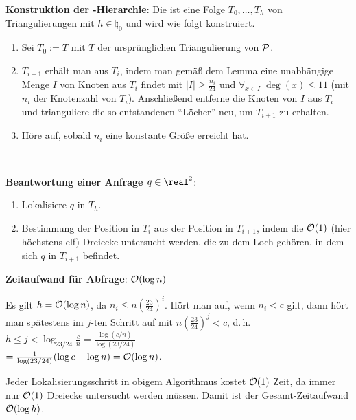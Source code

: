\textbf{Konstruktion der -Hierarchie}:
Die  ist eine Folge $T_0, \dotsc, T_h$
von Triangulierungen mit $h \in \natural_0$ und wird wie folgt konstruiert.
\begin{enumerate}
    \item
    Sei $T_0 := T$ mit $T$ der ursprünglichen Triangulierung von $\P$.
    
    \item
    $T_{i+1}$ erhält man aus $T_i$, indem man gemäß dem Lemma eine unabhängige Menge
    $I$ von Knoten aus $T_i$ findet mit
    $|I| \ge \frac{n_i}{24}$ und $\forall_{x \in I}\; \deg(x) \le 11$
    (mit $n_i$ der Knotenzahl von $T_i$).
    Anschließend entferne die Knoten von $I$ aus $T_i$ und trianguliere die
    so entstandenen "`Löcher"' neu, um $T_{i+1}$ zu erhalten.
    
    \item
    Höre auf, sobald $n_i$ eine konstante Größe erreicht hat.
\end{enumerate}

\linie\
\pagebreak


\textbf{Beantwortung einer Anfrage $q \in \real^2$}:
\begin{enumerate}
    \item
    Lokalisiere $q$ in $T_h$.
    
    \item
    Bestimmung der Position in $T_i$ aus der Position in $T_{i+1}$, indem die $\O(1)$
    (hier höchstens elf) Dreiecke untersucht werden, die zu dem Loch gehören, in dem sich
    $q$ in $T_{i+1}$ befindet.
\end{enumerate}

\textbf{Zeitaufwand für Abfrage}:
$\O(\log n)$

\begin{Beweis}
    Es gilt $h = \O(\log n)$, da $n_i \le n (\frac{23}{24})^i$.
    Hört man auf, wenn $n_i < c$ gilt, dann hört man spätestens im $j$-ten Schritt auf mit
    $n (\frac{23}{24})^j < c$, d.\,h.
    $h \le j < \log_{23/24} \frac{c}{n}
    = \frac{\log(c/n)}{\log(23/24)}$\\
    $= \frac{1}{\log(23/24)} (\log c - \log n) = \O(\log n)$.
    
    Jeder Lokalisierungsschritt in obigem Algorithmus kostet $\O(1)$ Zeit,
    da immer nur $\O(1)$ Dreiecke untersucht werden müssen.
    Damit ist der Gesamt-Zeitaufwand $\O(\log h)$.
\end{Beweis}

